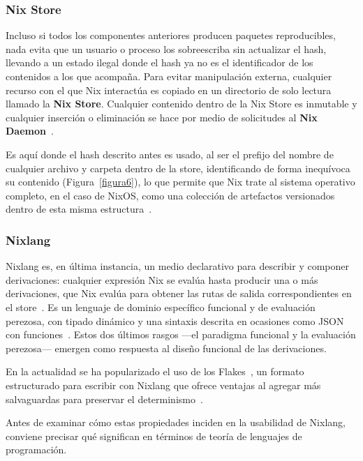 \subsubsection{Nix Store}

Incluso si todos los componentes anteriores producen paquetes reproducibles, nada evita que un usuario o proceso los sobreescriba sin actualizar el hash, llevando a un estado ilegal donde el hash ya no es el identificador de los contenidos a los que acompaña. Para evitar manipulación externa, cualquier recurso con el que Nix interactúa es copiado en un directorio de solo lectura llamado la \textbf{Nix Store}. Cualquier contenido dentro de la Nix Store es inmutable y cualquier inserción o eliminación se hace por medio de solicitudes al \textbf{Nix Daemon}~\cite{Dolstra2006}.

Es aquí donde el hash descrito antes es usado, al ser el prefijo del nombre de cualquier archivo y carpeta dentro de la store, identificando de forma inequívoca su contenido (Figura~\ref{figura6}), lo que permite que Nix trate al sistema operativo completo, en el caso de NixOS, como una colección de artefactos versionados dentro de esta misma estructura~\cite{Dolstra2008}.

\subsubsection{Nixlang}

Nixlang es, en última instancia, un medio declarativo para describir y componer derivaciones: cualquier expresión Nix se evalúa hasta producir una o más derivaciones, que Nix evalúa para obtener las rutas de salida correspondientes en el store~\cite{Dolstra2006}. Es un lenguaje de dominio específico funcional y de evaluación perezosa, con tipado dinámico y una sintaxis descrita en ocasiones como JSON con funciones~\cite{NixdevDocumentation}. Estos dos últimos rasgos ---el paradigma funcional y la evaluación perezosa--- emergen como respuesta al diseño funcional de las derivaciones.

En la actualidad se ha popularizado el uso de los Flakes~\cite{2025CommunitySurvey}, un formato estructurado para escribir con Nixlang que ofrece ventajas al agregar más salvaguardas para preservar el determinismo~\cite{NixdevDocumentation}.

Antes de examinar cómo estas propiedades inciden en la usabilidad de Nixlang, conviene precisar qué significan en términos de teoría de lenguajes de programación.

